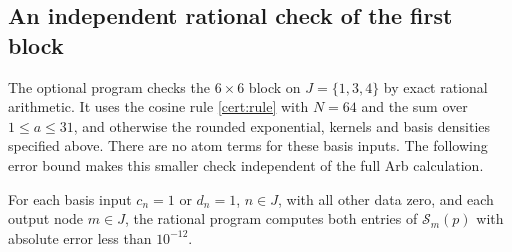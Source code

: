 \subsection{An independent rational check of the first block}
\label{cert:rational-small}

The optional program  checks
the $6\times6$ block on $J=\{1,3,4\}$ by exact rational arithmetic.
It uses the cosine rule \eqref{cert:rule} with $N=64$ and the sum over
$1\le a\le31$, and otherwise the rounded exponential, kernels and
basis densities specified above. There are no atom terms for these
basis inputs. The following error bound makes this smaller check
independent of the full Arb calculation.

\begin{lemma}\label{cert:rational-small-error}
For each basis input $c_n=1$ or $d_n=1$, $n\in J$, with all other data
zero, and each output node $m\in J$, the rational program computes
both entries of $\mathcal S_m(p)$ with absolute error less than
$10^{-12}$.
\end{lemma}

